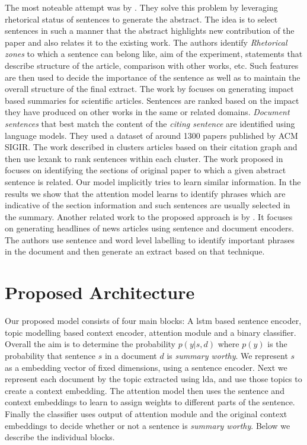 The most noteable attempt was by \cite{teufel2002summarizing}. They solve this problem by leveraging rhetorical status of sentences to generate the abstract. The idea is to select sentences in such a manner that the abstract highlights new contribution of the paper and also relates it to the existing work. The authors identify \emph{Rhetorical zones} to which a sentence can belong like, aim of the experiment, statements that describe structure of the article, comparison with other works, etc. Such features are then used to decide the importance of the sentence as well as to maintain the overall structure of the final extract. The work by \cite{mei2008generating} focuses on generating impact based summaries for scientific articles. Sentences are ranked based on the impact they have produced on other works in the same or related domains. \emph{Document sentences} that best match the content of the \emph{citing sentence} are identified using language models. They used a dataset of around 1300 papers published by ACM SIGIR. The work described in \cite{abu2011coherent} clusters articles based on their citation graph and then use lexank to rank sentences within each cluster. The work proposed in \cite{hirohata2008identifying} focuses on identifying the sections of original paper to which a given abstract sentence is related. Our model implicitly tries to learn similar information. In the results we show that the attention model learns to identify phrases which are indicative of the section information and such sentences are usually selected in the summary. Another related work to the proposed approach is by \cite{cheng2016neural}. It focuses on generating headlines of news articles using sentence and document encoders. The authors use sentence and word level labelling to identify important phrases in the document and then generate an extract based on that technique. 

\section{Proposed Architecture}

Our proposed model consists of four main blocks: A lstm based sentence encoder, topic modelling based context encoder, attention module and a binary classifier. Overall the aim is to determine the probability $p(y|s,d)$ where $p(y)$ is the probability that sentence $s$ in a document $d$ is \emph{summary worthy}. We represent $s$ as a embedding vector of fixed dimensions, using a sentence encoder. Next we represent each document by the topic extracted using lda, and use those topics to create a context embedding. The attention model then uses the sentence and context embeddings to learn to assign weights to different parts of the sentence. Finally the classifier uses output of attention module and the original context embeddings to decide whether or not a sentence is \emph{summary worthy}. Below we describe the individual blocks.

